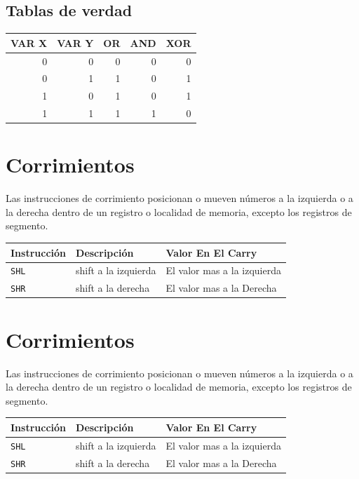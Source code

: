 \documentclass[12pt]{article}
\begin{document}
\subsection*{Tablas de verdad}
\label{sec:orgc3559d7}
\begin{center}
\begin{tabular}{|rr|r|r|r|}
\hline
VAR X & VAR Y & OR & AND & XOR\\
\hline
0 & 0 & 0 & 0 & 0\\
0 & 1 & 1 & 0 & 1\\
1 & 0 & 1 & 0 & 1\\
1 & 1 & 1 & 1 & 0\\
\hline
\end{tabular}
\end{center}

\section*{Corrimientos}
\label{sec:org62faf06}
Las instrucciones de corrimiento posicionan o mueven números a la izquierda o a la derecha dentro de un registro o localidad de memoria, excepto los registros de segmento.

\begin{center}
\begin{tabular}{|l|l|l|}
\hline
Instrucción & Descripción & Valor En El Carry\\
\hline
\texttt{SHL} & shift a la izquierda & El valor mas a la izquierda\\
\hline
\texttt{SHR} & shift a la derecha & El valor mas a la Derecha\\
\hline
\end{tabular}
\end{center}

\section*{Corrimientos}
\label{sec:orga2084b1}
Las instrucciones de corrimiento posicionan o mueven números a la izquierda o a la derecha dentro de un registro o localidad de memoria, excepto los registros de segmento.

\begin{center}
\begin{tabular}{|l|l|l|}
\hline
Instrucción & Descripción & Valor En El Carry\\
\hline
\texttt{SHL} & shift a la izquierda & El valor mas a la izquierda\\
\hline
\texttt{SHR} & shift a la derecha & El valor mas a la Derecha\\
\hline
\end{tabular}
\end{center}
\end{document}
